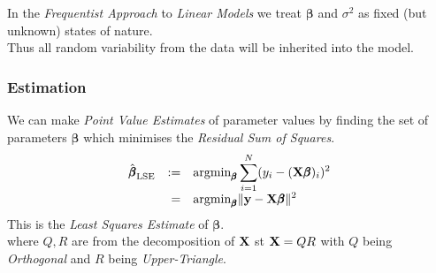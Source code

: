 \documentclass[11pt,a4paper]{article}
\begin{document}
In the \textit{Frequentist Approach} to \textit{Linear Models} we treat $\pmb\beta$ and $\sigma^2$ as fixed (but unknown) states of nature.\\
Thus all random variability from the data will be inherited into the model.\\

\subsubsection{Estimation}

We can make \textit{Point Value Estimates} of parameter values by finding the set of parameters $\pmb\beta$ which minimises the \textit{Residual Sum of Squares}.
\[\begin{array}{rrl}
\hat{\pmb\beta}_\text{LSE}&:=&\displaystyle{\text{argmin}_{\pmb\beta}\sum_{i=1}^N(y_i-(\textbf{X}\pmb\beta)_i)^2}\\
&=&\displaystyle{\text{argmin}_{\pmb\beta}\|\textbf{y}-\textbf{X}\pmb\beta\|^2}
\end{array}\]
\nb This is the \textit{Least Squares Estimate} of $\pmb\beta$.\\

where $Q,R$ are from the decomposition of $\textbf{X}$ st $\textbf{X}=QR$ with $Q$ being \textit{Orthogonal} and $R$ being \textit{Upper-Triangle}.\\
\end{document}
